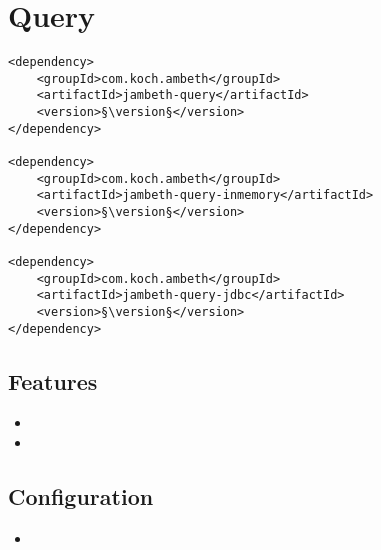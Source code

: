 \section{Query}
\label{module:Query}
\ClearAPI
\TODO
\begin{lstlisting}[style=POM,caption={Maven modules to use \emph{Ambeth Query}}]
<dependency>
	<groupId>com.koch.ambeth</groupId>
	<artifactId>jambeth-query</artifactId>
	<version>§\version§</version>
</dependency>

<dependency>
	<groupId>com.koch.ambeth</groupId>
	<artifactId>jambeth-query-inmemory</artifactId>
	<version>§\version§</version>
</dependency>

<dependency>
	<groupId>com.koch.ambeth</groupId>
	<artifactId>jambeth-query-jdbc</artifactId>
	<version>§\version§</version>
</dependency>
\end{lstlisting}
\subsection{Features}
\begin{itemize}
	\item {}
	\item \TODO
\end{itemize}

\subsection{Configuration}
\begin{itemize}
	\item {}
\end{itemize}
